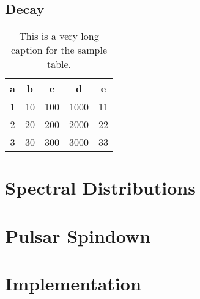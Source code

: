 \subsection*{Decay}

\begin{table}
	\centering
	\caption[This is a short test caption.]{This is a very long caption for the sample table.}
	\label{tab:test}
	\begin{tabular}{c c c c c}
		\toprule
		a & b & c & d & e \\
		\midrule
		1 & 10 & 100 & 1000 & 11 \\
		2 & 20 & 200 & 2000 & 22 \\
		3 & 30 & 300 & 3000 & 33 \\
		\bottomrule
	\end{tabular}
\end{table}

\section{Spectral Distributions}
\label{sec:spectral}

\section{Pulsar Spindown}
\label{sec:spindown}

\section{Implementation}
\label{sec:implementation}

